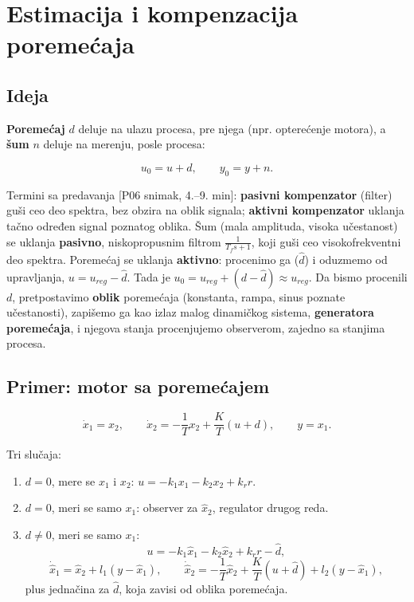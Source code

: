 \documentclass[11pt,a4paper,parskip=half,headsepline,numbers=noenddot]{scrartcl}
\DeclareRobustCommand{\izvor}[1]{{\small\color{izvorC}[#1]}}
\begin{document}
\section{Estimacija i kompenzacija poremećaja}

\subsection{Ideja}

\textbf{Poremećaj} \(d\) deluje na ulazu procesa, pre njega (npr. opterećenje motora), a \textbf{šum} \(n\) deluje na merenju, posle procesa:

\[u_0 = u + d,\qquad y_0 = y + n .\]

Termini sa predavanja \izvor{P06 snimak, 4.--9. min}: \textbf{pasivni kompenzator} (filter) guši ceo deo spektra, bez obzira na oblik signala; \textbf{aktivni kompenzator} uklanja tačno određen signal poznatog oblika. Šum (mala amplituda, visoka učestanost) se uklanja \textbf{pasivno}, niskopropusnim filtrom \(\frac{1}{T_fs+1}\), koji guši ceo visokofrekventni deo spektra. Poremećaj se uklanja \textbf{aktivno}: procenimo ga (\(\hat d\)) i oduzmemo od upravljanja, \(u = u_{reg} - \hat d\). Tada je \(u_0 = u_{reg} + (d - \hat d) \approx u_{reg}\). Da bismo procenili \(d\), pretpostavimo \textbf{oblik} poremećaja (konstanta, rampa, sinus poznate učestanosti), zapišemo ga kao izlaz malog dinamičkog sistema, \textbf{generatora poremećaja}, i njegova stanja procenjujemo observerom, zajedno sa stanjima procesa.

\subsection{Primer: motor sa poremećajem}

\[\dot x_1 = x_2,\qquad \dot x_2 = -\frac1T x_2 + \frac KT(u + d),\qquad y = x_1 .\]

Tri slučaja:

\begin{enumerate}
\def\labelenumi{\arabic{enumi}.}
\item \(d = 0\), mere se \(x_1\) i \(x_2\): \(u = -k_1x_1 - k_2x_2 + k_rr\).
\item \(d = 0\), meri se samo \(x_1\): observer za \(\hat x_2\), regulator drugog reda.
\item \(d \ne 0\), meri se samo \(x_1\):
  \[u = -k_1\hat x_1 - k_2\hat x_2 + k_rr - \hat d,\]
  \[\dot{\hat x}_1 = \hat x_2 + l_1(y - \hat x_1),\qquad \dot{\hat x}_2 = -\frac1T\hat x_2 + \frac KT(u + \hat d) + l_2(y - \hat x_1),\]
  plus jednačina za \(\hat d\), koja zavisi od oblika poremećaja.
\end{enumerate}
\end{document}

